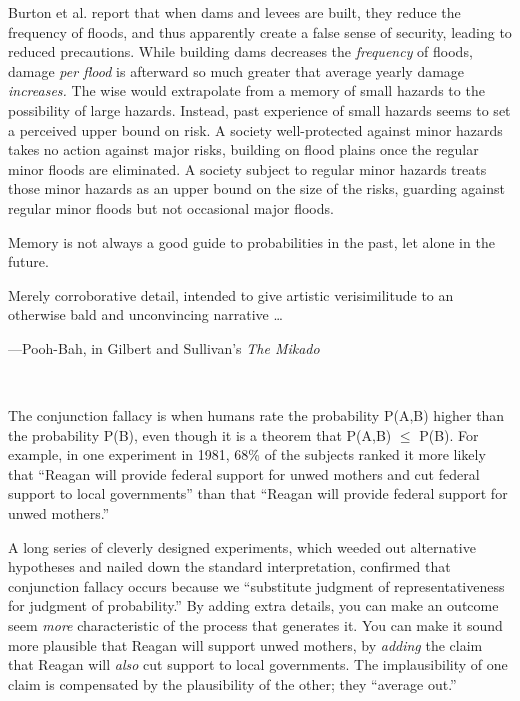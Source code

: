 {
 Burton et al. report that when dams and levees are built, they
reduce the frequency of floods, and thus apparently create a false
sense of security, leading to reduced precautions.
While building dams decreases the \textit{frequency} of floods, damage
\textit{per flood} is afterward so much greater that average yearly
damage \textit{increases.} The wise would extrapolate from a memory of
small hazards to the possibility of large hazards. Instead, past
experience of small hazards seems to set a perceived upper bound on
risk. A society well-protected against minor hazards takes no action
against major risks, building on flood plains once the regular minor
floods are eliminated. A society subject to regular minor hazards
treats those minor hazards as an upper bound on the size of the risks,
guarding against regular minor floods but not occasional major floods.}

{
 Memory is not always a good guide to probabilities in the past,
let alone in the future.}

\myendsectiontext


\bigskip


{
 Merely corroborative detail, intended to give artistic
verisimilitude to an otherwise bald and unconvincing narrative \ldots}

{\raggedleft
 {}---Pooh-Bah, in Gilbert and Sullivan's
\textit{The Mikado}
\par}


\bigskip

{
 ~}

{
 The conjunction fallacy is when humans rate the probability P(A,B)
higher than the probability P(B), even though it is a theorem that
P(A,B) ${\leq}$ P(B). For example, in one experiment in 1981, 68\% of
the subjects ranked it more likely that ``Reagan will
provide federal support for unwed mothers and cut federal support to
local governments'' than that
``Reagan will provide federal support for unwed
mothers.''}

{
 A long series of cleverly designed experiments, which weeded out
alternative hypotheses and nailed down the standard interpretation,
confirmed that conjunction fallacy occurs because we
``substitute judgment of representativeness for
judgment of probability.'' By adding extra details,
you can make an outcome seem \textit{more} characteristic of the
process that generates it. You can make it sound more plausible that
Reagan will support unwed mothers, by \textit{adding} the claim that
Reagan will \textit{also} cut support to local governments. The
implausibility of one claim is compensated by the plausibility of the
other; they ``average out.''}


